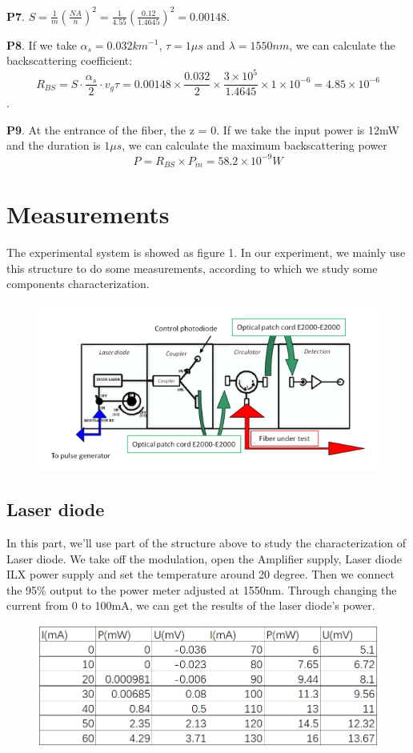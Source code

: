 \documentclass{article}
\begin{document}
	\textbf{P7}. $S = \frac{1}{m} (\frac{NA}{n})^2 = \frac{1}{4.55} (\frac{0.12}{1.4645})^2 = 0.00148$.
	
	\textbf{P8}. If we take $\alpha_s = 0.032km^{-1}$, $\tau = 1\mu s$ and $\lambda = 1550nm$, we can calculate the backscattering coefficient:
	$$R_{BS} = S \cdot \frac{\alpha_s}{2}\cdot v_g\tau = 0.00148 \times \frac{0.032}{2}\times \frac{3\times 10^5}{1.4645}\times 1\times 10^{-6}=4.85 \times 10^{-6}$$.
	
	\textbf{P9}. At the entrance of the fiber, the z = 0. If we take the input power is 12mW and the duration is $1\mu s$, we can calculate the maximum backscattering power
	$$P = R_{BS} \times P_{in} = 58.2 \times 10^{-9}W$$
	
	\section{Measurements}
	The experimental system is showed as figure 1. In our experiment, we mainly use this structure to do some measurements, according to which we study some components characterization.
	
	\begin{figure}[H]
		\centering
		\includegraphics[width=0.7\linewidth]{figure1}
		\caption{}
		\label{fig:figure1}
	\end{figure}
	
	\subsection{Laser diode}
	In this part, we'll use part of the structure above to study the characterization of Laser diode. We take off the modulation, open the Amplifier supply, Laser diode ILX power supply and set the temperature around 20 degree. Then we connect the 95\% output to the power meter adjusted at 1550nm. Through changing the current from 0 to 100mA, we can get the results of the laser diode's power.
	
	\begin{figure}[H]
		\centering
		\includegraphics[width=0.7\linewidth]{table1}
		\caption{}
		\label{fig:table1}
	\end{figure}
	
\end{document}
